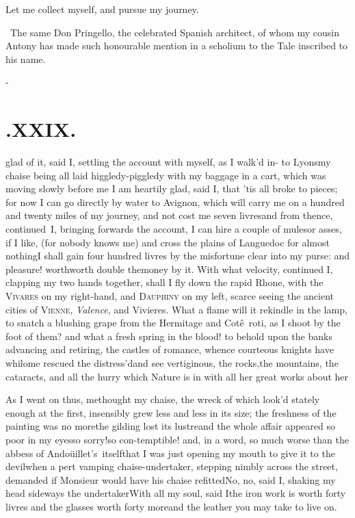 \documentclass{article}
\begin{document}
\tsh Let me collect myself, and pursue my journey.

\bigskip
\bgroup\footnotesize
\indent\fnast\ The same Don Pringello, the
celebrated Spa\-nish architect, of whom my cousin Antony has\break
made such honourable mention in a scholium to\break
the Tale inscribed to his name.\\\par
\egroup

\vfill{}\eject
\null\kern-\baselineskip
\section{.\enspace XXIX.}

 glad of it, said I, settling the account with myself, as I
walk’d in-\break
to Lyons\tsh my chaise being all laid higgledy-piggledy
with my baggage in a cart, which was moving slowly before me\tsh
I am heartily glad, said I, that ’tis all broke to pieces; for
now I can go directly by water to Avignon, which will carry me
on a hundred and twenty miles of my journey, and not cost me
seven livres\tsh and from thence, continued~I, bringing forwards
the account, I can hire a couple of mules\tsk or asses, if I
like, (for nobody knows me) and cross the plains of Languedoc
for almost nothing\tsh I shall gain four hundred livres by the
misfortune clear into my purse: and pleasure! worth\tsk worth
double the\break money by it. With what velocity, continued I,
clapping my two hands toge\-ther, shall I fly down the rapid
Rhone, with the \textsc{Vivares} on my right-hand, and
\textsc{Dauphiny} on my left, scarce seeing the ancient cities
of \textsc{Vienne}, \textit{Valence}, and Vivieres. What a flame
will it rekindle in the lamp, to snatch a blushing grape from
the Hermitage and Cotê\sic\ roti, as I shoot by the foot of them? and
what a fresh spring in the blood!  to behold upon the banks
advancing and retiring, the castles of romance, whence courteous
knights have whilome rescued the distress’d\tsh and see
vertiginous, the rocks,\break the mountains, the cataracts, and all
the hurry which Nature is in with all her great works about
her\tsh{}

As I went on thus, methought my chaise, the wreck of which look’d stately
enough at the first, insensibly grew less and less in its size; the freshness
of the painting was no more\tsk the gilding lost its lustre\tsk and the
whole affair appeared so poor in my eyes\tsk so sorry!\tsk so
con-\break temptible!
and, in a word, so much worse than the abbess of Andoüillet’s\sic\ 
itself\tsk that I was just opening my mouth to give it to the
devil\tsk when a pert vamping chaise-undertaker, stepping nimbly across the
street, demanded if Monsieur would have his chaise refitted\tsk No,
no, said I, shaking my head sideways\tsk{}
the undertaker\tsk With all my soul, said\break
I\tsk the iron work is worth forty livres\tsk\break
and the glasses worth forty more\tsk and the leather
you may take to live on.
\end{document}
